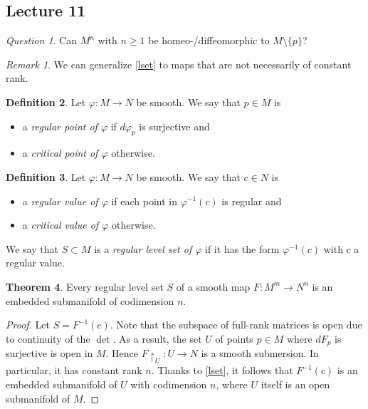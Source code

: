 \documentclass[10pt,letterpaper,cm]{nupset}
\theoremstyle{definition}
\newtheorem{definition}{Definition}[subsection]
\theoremstyle{theorem}
\newtheorem{theorem}[definition]{Theorem}
\theoremstyle{remark}
\newtheorem{remark}[definition]{Remark}
\newtheorem*{question}{Question}
\newcommand{\1}{\mathbf{1}}
\newcommand{\0}{\vec 0}
\begin{document}
\subsection{Lecture 11}

\begin{question}
Can $M^n$ with $n\geq 1$ be homeo-/diffeomorphic to $M\setminus \{p\}$? 
\end{question}

\medskip

\begin{remark}
We can generalize \cref{lset} to maps that are not necessarily of constant rank.
\end{remark}

\begin{definition}
Let $\varphi : M \to N$ be smooth. We say that $p\in M$ is
\begin{itemize}
\item a \textit{regular point of $\varphi$} if $d\varphi_p$ is surjective and
\item a \textit{critical point of $\varphi$} otherwise.
\end{itemize}
\end{definition}

\begin{definition}
Let $\varphi : M \to N$ be smooth.  We say that $c \in N$ is
\begin{itemize}
\item  a \textit{regular value of $\varphi$} if each point in $\varphi^{-1}(c)$ is regular and
\item a \textit{critical value of $\varphi$} otherwise.
\end{itemize}
We say that $S \subset M$ is a \textit{regular level set of $\varphi$} if it has the form $\varphi^{-1}(c)$ with $c$ a regular value.
\end{definition}


\begin{theorem}\label{rls}
Every regular level set $S$ of a smooth map $F: M^m \to N^n$ is an embedded submanifold of codimension $n$.
\end{theorem}
\begin{proof}
Let $S= F^{-1}(c)$. Note that  the subspace of full-rank matrices is open due to continuity of the $\det$. As a result, the set $U$ of points $p\in M$ where $dF_p$ is surjective is open in $M$. Hence $F\restriction_U : U \to N$ is a smooth submersion. In particular, it has constant rank $n$. Thanks to \cref{lset}, it follows that $F^{-1}(c)$ is an embedded submanifold of $U$ with codimension $n$, where $U$ itself is an open submanifold of $M$.
\end{proof}
\end{document}
